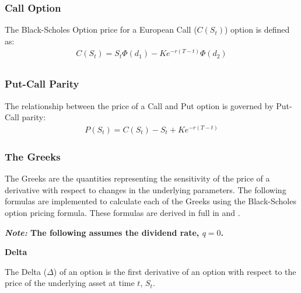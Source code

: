 \documentclass[10pt]{article}
\begin{document}
        


        \subsubsection{Call Option}

        The Black-Scholes Option price for a European Call ($C(S_t)$) option is defined as:
        \begin{gather*}
            C(S_t) = S_t \Phi(d_1) - K e^{-r(T-t)} \Phi(d_2) \\
        \end{gather*}

        


        \subsubsection{Put-Call Parity}

        The relationship between the price of a Call and Put option is governed by Put-Call parity:
        \begin{gather*}
            P(S_t) = C(S_t) - S_t + K e^{-r(T-t)}
        \end{gather*}
    
        


        \subsubsection{The Greeks}

        The Greeks are the quantities representing the sensitivity of the price of a derivative with respect to changes in the underlying parameters. The following formulas are implemented to calculate each of the Greeks using the Black-Scholes option pricing formula. These formulas are derived in full in \cite{Stefanica2011} and \cite{Weerawarana2016}.

        \begin{center}
            \textbf{\textit{Note:} The following assumes the dividend rate, $q = 0$.}
        \end{center}
    
        \textbf{Delta}
    
        The Delta ($\Delta$) of an option is the first derivative of an option with respect to the price of the underlying asset at time $t$, $S_t$.
    
\end{document}
